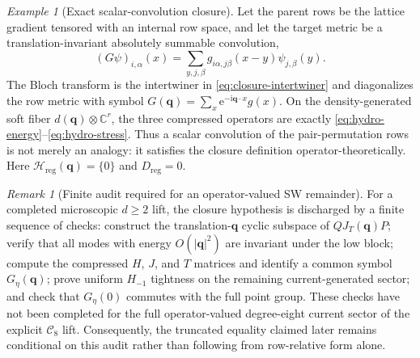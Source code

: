 \documentclass[11pt]{article}
\theoremstyle{definition}
\theoremstyle{remark}
\newtheorem{remark}[theorem]{Remark}
\newtheorem{example}[theorem]{Example}
\newcommand{\cH}{\mathcal H}
\newcommand{\cC}{\mathcal C}
\newcommand{\I}{\mathrm i}
\newcommand{\e}{\mathrm e}
\newcommand{\abs}[1]{\left\lvert #1\right\rvert}
\newcommand{\bq}{\bm q}
\begin{document}
\begin{example}[Exact scalar-convolution closure]
\label{ex:scalar-convolution}
Let the parent rows be the lattice gradient tensored with an internal row space,
and let the target metric be a translation-invariant absolutely summable
convolution,
\begin{equation}
 (G\psi)_{i,\alpha}(x)
 =\sum_{y,j,\beta}g_{i\alpha,j\beta}(x-y)\psi_{j,\beta}(y).
 \label{eq:convolution-metric}
\end{equation}
The Bloch transform is the intertwiner in
\eqref{eq:closure-intertwiner} and diagonalizes the row metric with symbol
$G(\bq)=\sum_x\e^{-\I\bq\cdot x}g(x)$.  On the density-generated soft fiber
$d(\bq)\otimes\mathbb C^r$, the three compressed operators are exactly
\eqref{eq:hydro-energy}--\eqref{eq:hydro-stress}.  Thus a scalar convolution of
the pair-permutation rows is not merely an analogy: it satisfies the closure
definition operator-theoretically.  Here
$\cH_{\mathrm{reg}}(\bq)=\{0\}$ and $D_{\mathrm{reg}}=0$.
\end{example}

\begin{remark}[Finite audit required for an operator-valued SW remainder]
\label{rem:closure-audit}
For a completed microscopic $d\ge2$ lift, the closure hypothesis is discharged
by a finite sequence of checks: construct the translation-$\bq$ cyclic subspace
of $QJ_T(\bq)P$; verify that all modes with energy $O(\abs\bq^2)$ are invariant
under the low block; compute the compressed $H$, $J$, and $T$ matrices and
identify a common symbol $G_\eta(\bq)$; prove uniform $H_{-1}$ tightness on the
remaining current-generated sector; and check that $G_\eta(0)$ commutes with the
full point group.  These checks have not been completed for the full
operator-valued degree-eight current sector of the explicit $\cC_8$ lift.
Consequently, the truncated equality claimed later remains conditional on this
audit rather than following from row-relative form alone.
\end{remark}
\end{document}
